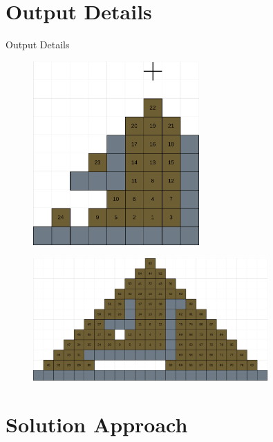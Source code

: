 \documentclass{beamer}
\begin{document}
\section{Output Details}

\begin{frame}{Output Details}
    \begin{minipage}[c]{0.4\textwidth}
        \begin{figure}[H]
            \centering
            \includegraphics[width=0.565\textwidth]{Images/AoC22_14_solution_part_1.png}
        \end{figure}
    \end{minipage}%
    \begin{minipage}[c]{0.6\textwidth}
        \begin{figure}[H]
            \centering
            \includegraphics[width=0.8\textwidth]{Images/AoC22_14_solution_part_2.png}
        \end{figure}
    \end{minipage}
\end{frame}

\section{Solution Approach}
\end{document}

